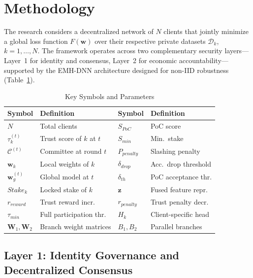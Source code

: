 \documentclass[conference]{IEEEtran}
\begin{document}
\section{Methodology}

The research considers a decentralized network of $N$ clients that jointly minimize a global loss function $F(\mathbf{w})$ over their respective private datasets $\mathcal{D}_k$, $k = 1, \ldots, N$. The framework operates across two complementary security layers---Layer~1 for identity and consensus, Layer~2 for economic accountability---supported by the EMH-DNN architecture designed for non-IID robustness (Table~\ref{tab:symbols}).

\begin{table}[t]
\centering
\caption{Key Symbols and Parameters}
\label{tab:symbols}
\scriptsize
\setlength{\tabcolsep}{2pt}
\begin{tabular}{p{0.9cm}p{2.0cm}|p{0.9cm}p{2.0cm}}
\toprule
\textbf{Symbol} & \textbf{Definition} & \textbf{Symbol} & \textbf{Definition} \\
\midrule
$N$ & Total clients & $S_{PoC}$ & PoC score \\
$\tau_k^{(t)}$ & Trust score of $k$ at $t$ & $S_{min}$ & Min.\ stake \\
$\mathcal{C}^{(t)}$ & Committee at round $t$ & $P_{penalty}$ & Slashing penalty \\
$\mathbf{w}_k$ & Local weights of $k$ & $\delta_{drop}$ & Acc.\ drop threshold \\
$\mathbf{w}_g^{(t)}$ & Global model at $t$ & $\delta_{th}$ & PoC acceptance thr. \\
$Stake_k$ & Locked stake of $k$ & $\mathbf{z}$ & Fused feature repr. \\
$r_{reward}$ & Trust reward incr. & $r_{penalty}$ & Trust penalty decr. \\
$\tau_{min}$ & Full participation thr. & $H_k$ & Client-specific head \\
$\mathbf{W}_1,\mathbf{W}_2$ & Branch weight matrices & $B_1,B_2$ & Parallel branches \\
\bottomrule
\end{tabular}
\end{table}

\subsection{Layer 1: Identity Governance and Decentralized Consensus}
\end{document}
